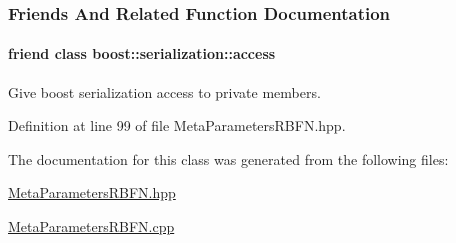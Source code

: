 \subsubsection{Friends And Related Function Documentation}
\hypertarget{classDmpBbo_1_1MetaParametersRBFN_ac98d07dd8f7b70e16ccb9a01abf56b9c}{
\paragraph[{boost\+::serialization\+::access}]{\setlength{\rightskip}{0pt plus 5cm}friend class boost\+::serialization\+::access\hspace{0.3cm}{\ttfamily [friend]}}}\label{classDmpBbo_1_1MetaParametersRBFN_ac98d07dd8f7b70e16ccb9a01abf56b9c}


Give boost serialization access to private members. 



Definition at line 99 of file Meta\+Parameters\+R\+B\+F\+N.\+hpp.



The documentation for this class was generated from the following files\+:\begin{DoxyCompactItemize}
\item 
\hyperlink{MetaParametersRBFN_8hpp}{Meta\+Parameters\+R\+B\+F\+N.\+hpp}\item 
\hyperlink{MetaParametersRBFN_8cpp}{Meta\+Parameters\+R\+B\+F\+N.\+cpp}\end{DoxyCompactItemize}
